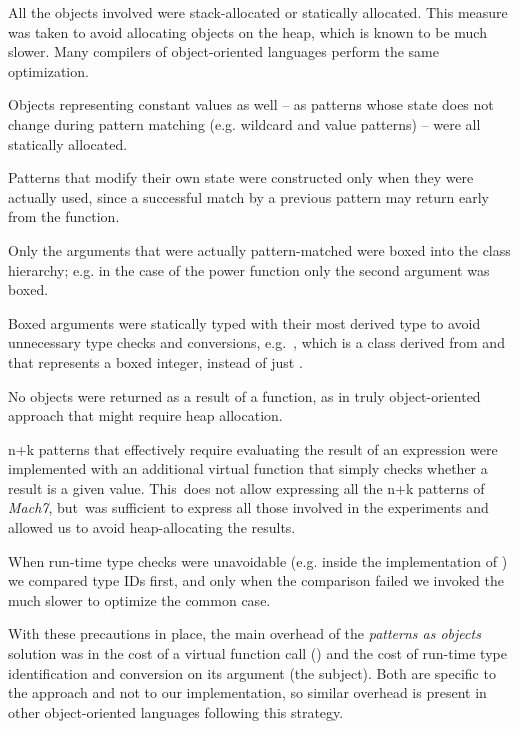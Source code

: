 \begin{compactitem}
\setlength{\itemsep}{0pt}
\setlength{\parskip}{0pt}
\item All the objects involved were stack-allocated or statically allocated. 
      This measure was taken to avoid allocating objects on the heap, which is 
      known to be much slower. Many compilers of 
      object-oriented languages perform the same optimization.
\item Objects representing constant values as well -- as patterns whose state 
      does not change during pattern matching (e.g. wildcard and value patterns) --
      were all statically allocated.
\item Patterns that modify their own state were constructed only when they were 
      actually used, since a successful match by a previous pattern may return 
      early from the function.
\item Only the arguments that were actually pattern-matched
      were boxed into the  class hierarchy; e.g. in the case of the power 
      function only the second argument was boxed.
\item Boxed arguments were statically typed with their most derived type to 
      avoid unnecessary type checks and conversions, e.g.~, 
      which is a class derived from  and that represents a boxed integer, 
      instead of just .
\item No objects were returned as a result of a function, as in truly 
      object-oriented approach that might require heap allocation.
\item n+k patterns that effectively require evaluating the result of an expression 
      were implemented with an additional virtual function that simply
      checks whether a result is a given value. This~does not allow expressing
      all the n+k patterns of \emph{Mach7}, but~was sufficient to express all those 
      involved in the experiments and allowed us to avoid heap-allocating the 
      results. 
\item When run-time type checks were unavoidable (e.g. inside the implementation of )
      we compared type IDs first, and only when the 
      comparison failed we invoked the much slower  to optimize 
      the common case.
\end{compactitem}

\noindent
With these precautions in place, the main overhead of the 
\emph{patterns as objects} solution was in the cost of a virtual 
function call () and the cost of run-time type 
identification and conversion on its argument (the subject). Both are specific 
to the approach and not to our implementation, so similar overhead is present in 
other object-oriented languages following this strategy.

